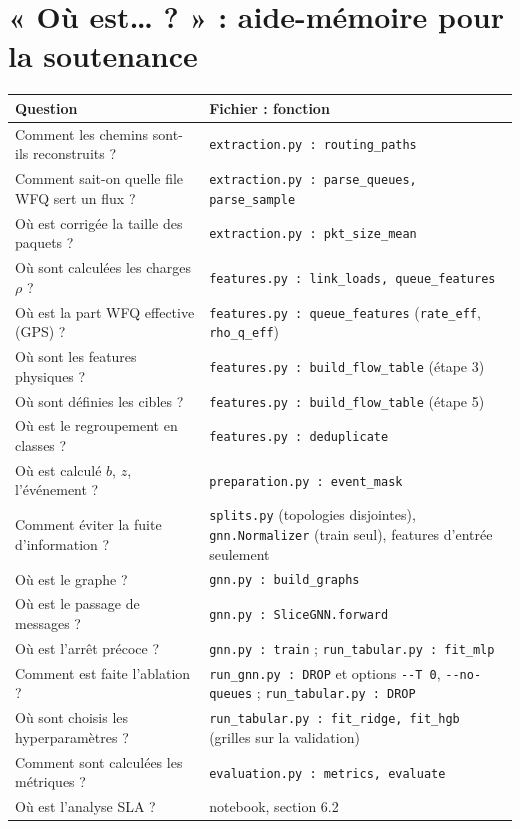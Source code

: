 \documentclass[11pt,a4paper]{article}
\newcommand{\f}[1]{\texttt{#1}}
\begin{document}
\section{« Où est… ? » : aide-mémoire pour la soutenance}
\begin{tabularx}{\linewidth}{@{}>{\raggedright}p{6.2cm}>{\raggedright\arraybackslash}X@{}}
\toprule
\bfseries Question & \bfseries Fichier : fonction\\
\midrule
Comment les chemins sont-ils reconstruits ? & \f{extraction.py : routing\_paths}\\
Comment sait-on quelle file WFQ sert un flux ? & \f{extraction.py : parse\_queues, parse\_sample}\\
Où est corrigée la taille des paquets ? & \f{extraction.py : pkt\_size\_mean}\\
Où sont calculées les charges $\rho$ ? & \f{features.py : link\_loads, queue\_features}\\
Où est la part WFQ effective (GPS) ? & \f{features.py : queue\_features} (\f{rate\_eff}, \f{rho\_q\_eff})\\
Où sont les features physiques ? & \f{features.py : build\_flow\_table} (étape 3)\\
Où sont définies les cibles ? & \f{features.py : build\_flow\_table} (étape 5)\\
Où est le regroupement en classes ? & \f{features.py : deduplicate}\\
Où est calculé $b$, $z$, l'événement ? & \f{preparation.py : event\_mask}\\
Comment éviter la fuite d'information ? & \f{splits.py} (topologies disjointes), \f{gnn.Normalizer} (train seul), features d'entrée seulement\\
Où est le graphe ? & \f{gnn.py : build\_graphs}\\
Où est le passage de messages ? & \f{gnn.py : SliceGNN.forward}\\
Où est l'arrêt précoce ? & \f{gnn.py : train} ; \f{run\_tabular.py : fit\_mlp}\\
Comment est faite l'ablation ? & \f{run\_gnn.py : DROP} et options \f{-{}-T 0}, \f{-{}-no-queues} ; \f{run\_tabular.py : DROP}\\
Où sont choisis les hyperparamètres ? & \f{run\_tabular.py : fit\_ridge, fit\_hgb} (grilles sur la validation)\\
Comment sont calculées les métriques ? & \f{evaluation.py : metrics, evaluate}\\
Où est l'analyse SLA ? & notebook, section 6.2\\
\bottomrule
\end{tabularx}
\end{document}
